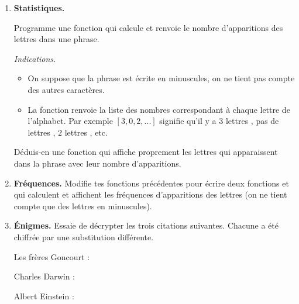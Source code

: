 \documentclass[11pt,class=report,crop=false]{standalone}
\begin{document}
\begin{activite}
\begin{enumerate}
  
  \item \textbf{Statistiques.}
  
  Programme une fonction  qui calcule et renvoie 
  le nombre d'apparitions des lettres dans une phrase.
  
  \emph{Indications.}
  \begin{itemize}
    \item On suppose que la phrase est écrite en minuscules, on ne tient pas compte des autres caractères.
    \item La fonction renvoie la liste des nombres correspondant à chaque lettre de l'alphabet. Par exemple $[3,0,2,...]$ signifie qu'il y a $3$ lettres , pas de lettres , $2$ lettres , etc.
  \end{itemize}
  
  Déduis-en une fonction  qui affiche proprement  les lettres qui apparaissent dans la phrase avec leur nombre d'apparitions.

  
  \item \textbf{Fréquences.}
  Modifie tes fonctions précédentes pour écrire deux fonctions
   et 
  qui calculent et affichent les fréquences d'apparitions des lettres (on ne tient compte que des lettres en minuscules).
  

 
  
  \item \textbf{\'Enigmes.} 
  Essaie de décrypter les trois citations suivantes. Chacune a été chiffrée par une substitution différente.
  
  Les frères Goncourt :
  \begin{center}
  \end{center}
  
  Charles Darwin :
  \begin{center}
  \end{center}
  
  Albert Einstein :
  \begin{center}
  \end{center}
\end{enumerate}  

 
\end{activite}
\end{document}
